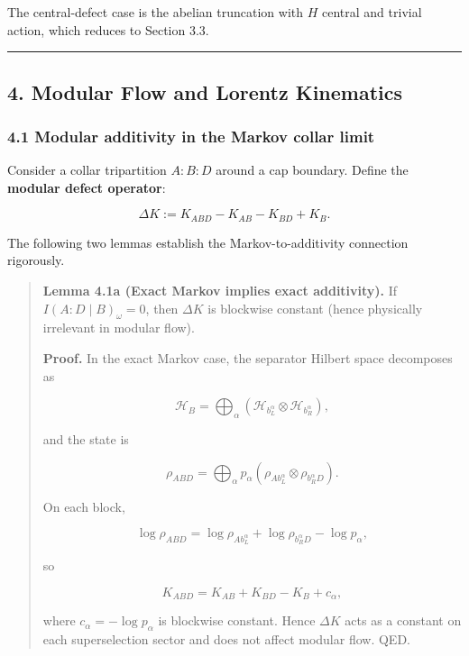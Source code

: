 The central-defect case is the abelian truncation with \(H\) central and trivial action, which reduces to Section 3.3.

\begin{center}\rule{0.5\linewidth}{0.5pt}\end{center}

\subsection{4. Modular Flow and Lorentz Kinematics}\label{4-modular-flow-and-lorentz-kinematics}

\subsubsection{4.1 Modular additivity in the Markov collar limit}\label{41-modular-additivity-in-the-markov-collar-limit}

Consider a collar tripartition \(A:B:D\) around a cap boundary. Define the \textbf{modular defect operator}:

\[
\Delta K := K_{ABD} - K_{AB} - K_{BD} + K_B.
\]

The following two lemmas establish the Markov-to-additivity connection rigorously.

\begin{quote}
\textbf{Lemma 4.1a (Exact Markov implies exact additivity).} If \(I(A:D \mid B)_\omega = 0\), then \(\Delta K\) is blockwise constant (hence physically irrelevant in modular flow).

\textbf{Proof.} In the exact Markov case, the separator Hilbert space decomposes as

\[
\mathcal H_B = \bigoplus_{\alpha} (\mathcal H_{b_L^{\alpha}} \otimes \mathcal H_{b_R^{\alpha}}),
\]

and the state is

\[
\rho_{ABD} = \bigoplus_{\alpha} p_{\alpha}
(\rho_{A b_L^{\alpha}} \otimes \rho_{b_R^{\alpha} D}).
\]

On each block,

\[
\log \rho_{ABD} = \log \rho_{A b_L^{\alpha}} + \log \rho_{b_R^{\alpha} D} - \log p_{\alpha},
\]

so

\[
K_{ABD} = K_{AB} + K_{BD} - K_B + c_\alpha,
\]

where \(c_\alpha = -\log p_\alpha\) is blockwise constant. Hence \(\Delta K\) acts as a constant on each superselection sector and does not affect modular flow. QED.
\end{quote}

